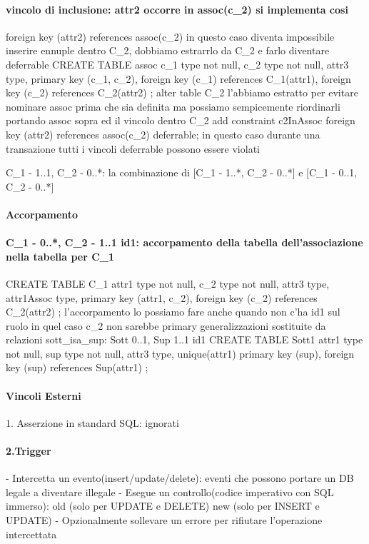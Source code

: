 \documentclass[12pt]{article}
\begin{document}
\paragraph{vincolo di inclusione: attr2 occorre in assoc(c_2) si implementa cosi}
					foreign key (attr2) references assoc(c_2)    in questo caso diventa impossibile inserire ennuple dentro C_2, dobbiamo estrarrlo da C_2 e farlo diventare deferrable
				CREATE TABLE assoc{
					c_1 type not null,
					c_2 type not null,
					attr3 type,
					primary key (c_1, c_2),
					foreign key (c_1) references C_1(attr1),
					foreign key (c_2) references C_2(attr2)
				};
				alter table C_2         l'abbiamo estratto per evitare nominare assoc prima che sia definita ma possiamo sempicemente riordinarli portando assoc sopra ed il vincolo dentro C_2
				add constraint c2InAssoc
				foreign key (attr2) references assoc(c_2) deferrable; in questo caso durante una transazione tutti i vincoli deferrable possono essere violati 

				C_1 - 1..1, C_2 - 0..*: la combinazione di [C_1 - 1..*, C_2 - 0..*] e [C_1 - 0..1, C_2 - 0..*]
\paragraph{Accorpamento}
\paragraph{C_1 - 0..*, C_2 - 1..1 {id1}: accorpamento della tabella dell'associazione nella tabella per C_1}
				CREATE TABLE C_1{
					attr1 type not null,
					c_2 type not null,
					attr3 type,
					attr1Assoc type,
					primary key (attr1, c_2),
					foreign key (c_2) references C_2(attr2)
				};
				l'accorpamento lo possiamo fare anche quando non c'ha {id1} sul ruolo in quel caso c_2 non sarebbe primary
				generalizzazioni sostituite da relazioni sott_isa_sup: Sott 0..1, Sup 1..1 {id1}
				CREATE TABLE Sott1{
					attr1 type not null,
					sup type not null,
					attr3 type,
					unique(attr1)
					primary key (sup),
					foreign key (sup) references Sup(attr1)
				};
\paragraph{Vincoli Esterni}
			1. Asserzione in standard SQL: ignorati 
\paragraph{2.Trigger}
				- Intercetta un evento(insert/update/delete): eventi che possono portare un DB legale a diventare illegale	
				- Esegue un controllo(codice imperativo con SQL immerso):
					old (solo per UPDATE e DELETE) 
					new (solo per INSERT e UPDATE)
				- Opzionalmente sollevare un errore per rifiutare l'operazione intercettata
\end{document}

